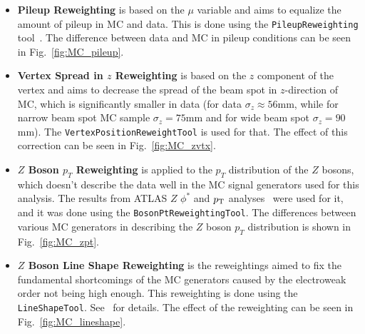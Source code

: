 \begin{itemize}
\item \textbf{Pileup Reweighting} is based on the $\mu$ variable and aims to equalize the amount of pileup in MC and data. This is done using the \texttt{PileupReweighting} tool~\cite{lib:pileuptool, lib:pileupscale}. The difference between data and MC in pileup conditions can be seen in Fig.~\ref{fig:MC_pileup}.
\item \textbf{Vertex Spread in $z$ Reweighting} is based on the $z$ component of the vertex and aims to decrease the spread of the beam spot in $z$-direction of MC, which is significantly smaller in data (for data $\sigma_z \approx 56$mm, while for narrow beam spot MC sample $\sigma_z = 75$mm and for wide beam spot $\sigma_z = 90$mm). The \texttt{VertexPositionReweightTool} is used for that. The effect of this correction can be seen in Fig.~\ref{fig:MC_zvtx}.
\item \textbf{$Z$ Boson $p_T$ Reweighting} is applied to the $p_T$ distribution of the $Z$ bosons, which doesn't describe the data well in the MC signal generators used for this analysis. The results from ATLAS $Z$ $\phi^*$ and $p_{\mathrm{T}}$ analyses~\cite{lib:Zphistar} were used for it, and it was done using the \texttt{BosonPtReweightingTool}. The differences between various MC generators in describing the $Z$ boson $p_T$ distribution is shown in Fig.~\ref{fig:MC_zpt}.
\item \textbf{$Z$ Boson Line Shape Reweighting} is the reweightings aimed to fix the fundamental shortcomings of the MC generators caused by the electroweak order not being high enough. This reweighting is done using the \texttt{LineShapeTool}. See~\cite{lib:lineshape} for details. The effect of the reweighting can be seen in Fig.~\ref{fig:MC_lineshape}.
\end{itemize}

